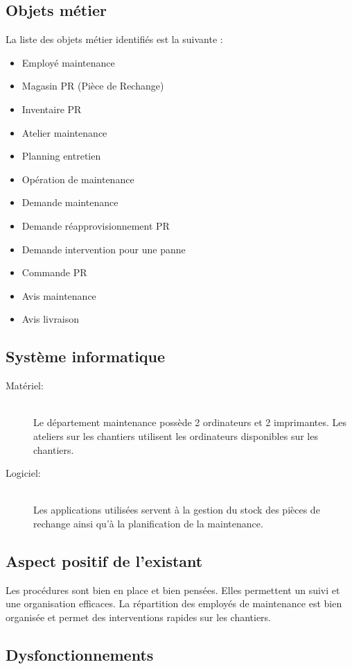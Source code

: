 \documentclass[twoside]{article}
\newcommand\el{\hfill\\}
\begin{document}
\subsection{Objets métier}

La liste des objets métier identifiés est la suivante :
\begin{itemize}
\item Employé maintenance
\item Magasin PR (Pièce de Rechange)
\item Inventaire PR
\item Atelier maintenance
\item Planning entretien
\item Opération de maintenance
\item Demande maintenance
\item Demande réapprovisionnement PR
\item Demande intervention pour une panne
\item Commande PR
\item Avis maintenance
\item Avis livraison
\end{itemize}

\subsection{Système informatique}

\begin{description}
\item [Matériel:]\el
Le département maintenance possède 2 ordinateurs et 2 imprimantes.
Les ateliers sur les chantiers utilisent les ordinateurs disponibles sur les
chantiers.

\item [Logiciel:]\el
Les applications utilisées servent à la gestion du stock des pièces de
rechange ainsi qu'à la planification de la maintenance.
\end{description}

\subsection{Aspect positif de l'existant}

Les procédures sont bien en place et bien pensées. Elles permettent un suivi
et une organisation efficaces.
La répartition des employés de maintenance est bien organisée et permet
des interventions rapides sur les chantiers.

\subsection{Dysfonctionnements}
\end{document}
